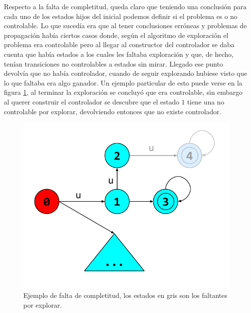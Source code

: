 Respecto a la falta de completitud, queda claro que teniendo una conclusión para cada uno de los estados hijos del inicial podemos definir si el problema es o no controlable. 
Lo que sucedía era que al tener conclusiones erróneas y problemas de propagación había ciertos casos donde, según el algoritmo de exploración el problema era controlable pero al llegar al constructor del controlador se daba cuenta que había estados a los cuales les faltaba exploración y que, de hecho, tenían transiciones no controlables a estados sin mirar. 
Llegado ese punto devolvía que no había controlador, cuando de seguir explorando hubiese visto que lo que faltaba era algo ganador. Un ejemplo particular de esto puede verse en la figura \ref{fig:faltaCompletitud}, al terminar la exploración se concluyó que era controlable, sin embargo al querer construir el controlador se descubre que el estado $1$ tiene una no controlable por explorar, devolviendo entonces que no existe controlador. 

\begin{figure}[htb]
 \centering
 \includegraphics[width=\linewidth/2]{figures/faltaDeCompletitud.pdf}
 \caption{Ejemplo de falta de completitud, los estados en gris son los faltantes por explorar.}
 \label{fig:faltaCompletitud}
\end{figure}    

